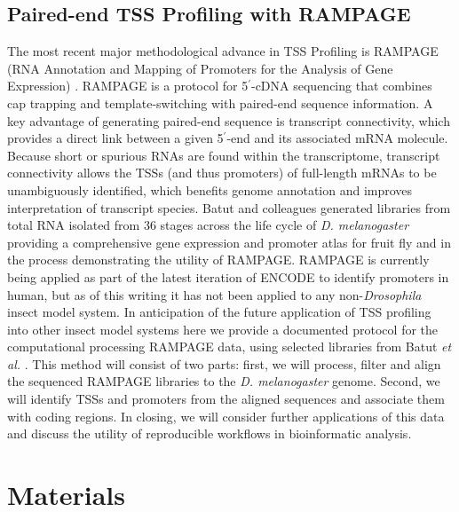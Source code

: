 \documentclass[runningheads,a4paper]{llncs}
\begin{document}
\begin{linenumbers}
\subsection{Paired-end TSS Profiling with RAMPAGE}
The most recent major methodological advance in TSS Profiling is RAMPAGE (RNA Annotation and Mapping of Promoters for the Analysis of Gene Expression) \cite{Batut:2012kc,Batut:2013fu}. 
RAMPAGE is a protocol for 5$^\prime$-cDNA sequencing that combines cap trapping and template-switching with paired-end sequence information. 
A key advantage of generating paired-end sequence is transcript connectivity, which provides a direct link between a given 5$^\prime$-end and its associated mRNA molecule.
Because short or spurious RNAs are found within the transcriptome, transcript connectivity allows the TSSs (and thus promoters) of full-length mRNAs to be unambiguously identified, which benefits genome annotation and improves interpretation of transcript species.
Batut and colleagues \cite{Batut:2012kc} generated libraries from total RNA isolated from 36 stages across the life cycle of \textit{D. melanogaster} providing a comprehensive gene expression and promoter atlas for fruit fly and in the process demonstrating the utility of RAMPAGE.
RAMPAGE is currently being applied as part of the latest iteration of ENCODE to identify promoters in human, but as of this writing it has not been applied to any non-\textit{Drosophila} insect model system. 
In anticipation of the future application of TSS profiling into other insect model systems here we provide a documented protocol for the computational processing RAMPAGE data, using selected libraries from Batut \textit{et al.} \cite{Batut:2012kc}. 
This method will consist of two parts: first, we will process, filter and align the sequenced RAMPAGE libraries to the \textit{D. melanogaster} genome. 
Second, we will identify TSSs and promoters from the aligned sequences and associate them with coding regions.
In closing, we will consider further applications of this data and discuss the utility of reproducible workflows in bioinformatic analysis.


\section{Materials}


\end{linenumbers}
\end{document}

